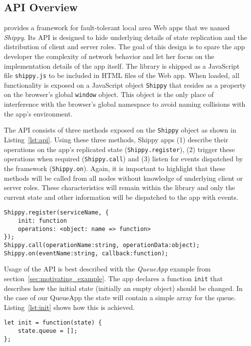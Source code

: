 \subsection{API Overview}
\label{sub:approach_api_overview}

\APIName provides a framework for fault-tolerant local area Web apps that we named \textit{Shippy}.
Its API is designed to hide underlying details of state replication and the distribution of client and server roles.
The goal of this design is to spare the app developer the complexity of network behavior and let her focus on the implementation details of the app itself.
The library is shipped as a JavaScript file \texttt{shippy.js} to be included in HTML files of the Web app.
When loaded, all functionality is exposed on a JavaScript object \texttt{Shippy} that resides as a property on the browser's global \texttt{window} object.
This object is the only place of interference with the browser's global namespace to avoid naming collisions with the app's environment.

The API consists of three methods exposed on the \texttt{Shippy} object as shown in Listing~\ref{lst:api}.
Using these three methods, Shippy apps (1) describe their operations on the app's replicated state (\texttt{Shippy.register}), (2) trigger these operations when required (\texttt{Shippy.call}) and (3) listen for events dispatched by the framework (\texttt{Shippy.on}).
Again, it is important to highlight that these methods will be called from all nodes without knowledge of underlying client or server roles.
These characteristics will remain within the library and only the current state and other information will be dispatched to the app with events.

\begin{lstlisting}[caption={\APIName API},label={lst:api}]
Shippy.register(serviceName, {
    init: function
    operations: <object: name => function>
});
Shippy.call(operationName:string, operationData:object);
Shippy.on(eventName:string, callback:function);
\end{lstlisting}

Usage of the API is best described with the \textit{QueueApp} example from section~\ref{sec:motivating_example}.
The app declares a function \texttt{init} that describes how the initial state (initially an empty object) should be changed.
In the case of our QueueApp the state will contain a simple array for the queue.
Listing~\ref{lst:init} shows how this is achieved.

\begin{lstlisting}[caption={QueueApp init function},label={lst:init}]
let init = function(state) {
    state.queue = [];
};
\end{lstlisting}

